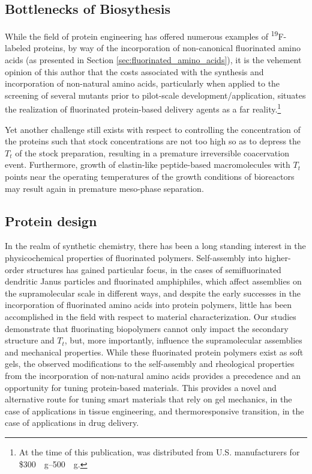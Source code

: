 \begin{refsection}
\subsection{Bottlenecks of Biosythesis}

While the field of protein engineering has offered numerous examples of
\textsuperscript{19}F-labeled proteins, by way of the incorporation of
non-canonical fluorinated amino acids (as presented in Section
\ref{sec:fluorinated_amino_acids}), it is the vehement opinion of this author
that the costs associated with the synthesis and incorporation of non-natural
amino acids,\cite{Hodgson2004,Ojima1989} particularly when applied to the
screening of several mutants prior to pilot-scale development/application, 
situates the realization of fluorinated protein-based delivery agents as a far
reality.\footnote{At the time of this publication,  was
distributed from U.S. manufacturers for
\$\SIrange[range-phrase=--]{300}{500}{\per\gram}.}

Yet another challenge still exists with respect to controlling the concentration
of the proteins such that stock concentrations are not too high so as to depress
the ${T_t}$ of the stock preparation, resulting in a premature irreversible
coacervation event. Furthermore, growth of elastin-like peptide-based
macromolecules with ${T_t}$ points near the operating temperatures of the growth
conditions of bioreactors may result again in premature meso-phase separation.

\subsection{Protein design}

In the realm of synthetic chemistry, there has been a long standing interest in
the physicochemical properties of fluorinated polymers. Self-assembly into
higher-order structures has gained particular focus, in the cases of
semifluorinated dendritic Janus particles and fluorinated amphiphiles, which
affect assemblies on the supramolecular scale in different ways, and
despite the early successes in the incorporation of fluorinated amino acids into
protein polymers, little has been accomplished in the field with respect to
material characterization. Our studies demonstrate that fluorinating biopolymers
cannot only impact the secondary structure and ${T_t}$, but, more importantly,
influence the supramolecular assemblies and mechanical properties. While these
fluorinated protein polymers exist as soft gels, the observed modifications to
the self-assembly and rheological properties from the incorporation of
non-natural amino acids provides a precedence and an opportunity for tuning
protein-based materials. This provides a novel and alternative route for tuning
smart materials that rely on gel mechanics, in the case of applications in
tissue engineering, and thermoresponsive transition, in the case of applications
in drug delivery. 


\end{refsection}
